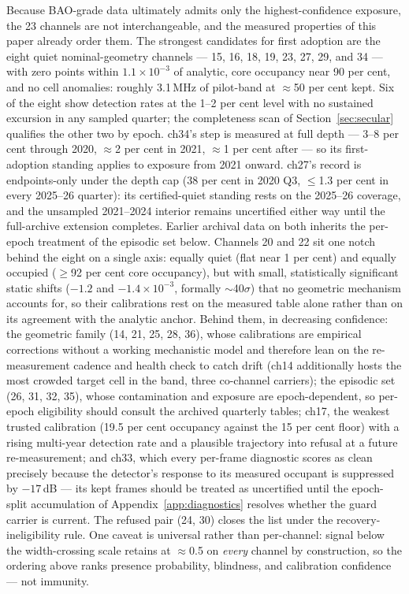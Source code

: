 Because BAO-grade data ultimately admits only the highest-confidence
exposure, the 23 channels are not interchangeable, and the measured
properties of this paper already order them. The
strongest candidates for first adoption are the eight quiet
nominal-geometry channels --- 15, 16, 18, 19, 23, 27, 29, and 34 ---
with zero points within $1.1\times10^{-3}$ of analytic, core occupancy
near 90 per cent, and no cell anomalies: roughly 3.1\,MHz of
pilot-band at $\approx$50 per cent kept. Six of the eight show
detection rates at the 1--2 per cent level with no sustained excursion
in any sampled quarter; the completeness scan of
Section~\ref{sec:secular} qualifies the other two by epoch. ch34's
step is measured at full depth --- 3--8 per cent through 2020,
$\approx$2 per cent in 2021, $\approx$1 per cent after --- so its
first-adoption standing applies to exposure from 2021 onward. ch27's
record is endpoints-only under the depth cap (38 per cent in 2020 Q3,
$\le$1.3 per cent in every 2025--26 quarter): its certified-quiet
standing rests on the 2025--26 coverage, and the unsampled 2021--2024
interior remains uncertified either way until the full-archive
extension completes. Earlier archival data on both inherits the
per-epoch treatment of the episodic set below. Channels 20 and 22 sit one notch behind the eight on a
single axis: equally quiet (flat near 1 per cent) and equally occupied
($\ge$92 per cent core occupancy), but with small, statistically
significant static shifts ($-1.2$ and $-1.4\times10^{-3}$, formally
$\sim$40$\sigma$) that no geometric mechanism accounts for, so their
calibrations rest on the measured table alone rather than on its
agreement with the analytic anchor. Behind them, in decreasing
confidence: the geometric family (14, 21, 25, 28, 36), whose
calibrations are empirical corrections without a working mechanistic
model and therefore lean on the re-measurement cadence and health
check to catch drift (ch14 additionally hosts the most crowded target
cell in the band, three co-channel carriers); the episodic set (26,
31, 32, 35), whose contamination and exposure are epoch-dependent, so
per-epoch eligibility should consult the archived quarterly tables;
ch17, the weakest trusted calibration (19.5 per cent occupancy against
the 15 per cent floor) with a rising multi-year detection rate and a
plausible trajectory into refusal at a future re-measurement; and
ch33, which every per-frame diagnostic scores as clean precisely
because the detector's response to its measured occupant is suppressed
by $-17$\,dB --- its kept frames should be treated as uncertified
until the epoch-split accumulation of
Appendix~\ref{app:diagnostics} resolves whether the guard carrier is
current. The refused pair (24, 30) closes the list under the
recovery-ineligibility rule. One caveat is universal rather than
per-channel: signal below the width-crossing scale retains at
$\approx$0.5 on \emph{every} channel by construction, so the ordering
above ranks presence probability, blindness, and calibration
confidence --- not immunity.

